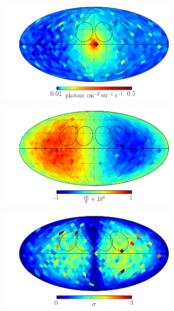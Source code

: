 \documentclass[aps,prl,10pt,twocolumn,superscriptaddress,showpacs]{revtex4-1}
\begin{document}
\begin{figure}[h!]
\centering
\begin{subfigure}[b]{1.0\columnwidth}
	\includegraphics[width=\textwidth]{flux_map_374.png}
\end{subfigure}
\par\medskip
\begin{subfigure}[b]{1.0\columnwidth}
	\includegraphics[width=\textwidth]{line_map_374.png}
\end{subfigure}
\par\medskip
\begin{subfigure}[b]{1.0\columnwidth}
	\includegraphics[width=\textwidth]{sigma_map_374.png}

\end{subfigure}
\end{figure}
\end{document}
